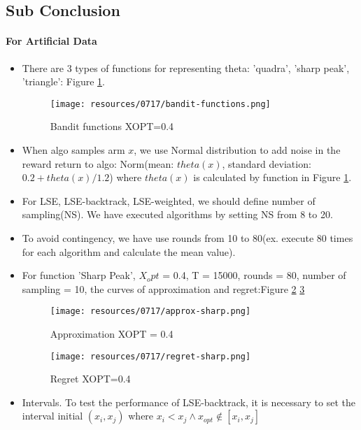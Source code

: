 \subsection*{Sub Conclusion}

\paragraph{For Artificial Data}
\begin{itemize}
	\item There are 3 types of functions for representing theta: 'quadra', 'sharp peak', 'triangle': Figure \ref{bandit-functions0.4}.
		\begin{figure}[h]
		\centering
		\texttt{[image: resources/0717/bandit-functions.png]}
		\caption{Bandit functions XOPT=0.4}
		\label{bandit-functions0.4}
		\end{figure}
		
	\item When algo samples arm $x$, we use Normal distribution to add noise in the reward return to algo: Norm(mean: $theta(x)$, standard deviation: $0.2 + theta(x)/1.2$) where $theta(x)$ is calculated by function in Figure \ref{bandit-functions0.4}.
	
	\item For LSE, LSE-backtrack, LSE-weighted, we should define number of sampling(NS). We have executed algorithms by setting NS from 8 to 20.
	
	\item To avoid contingency, we have use rounds from 10 to 80(ex. execute 80 times for each algorithm and calculate the mean value).
	
	\item For function 'Sharp Peak', $X_opt$ = 0.4, T = 15000, rounds = 80, number of sampling = 10, the curves of approximation and regret:Figure \ref{approx-sharp} \ref{regret-sharp}
	
	\begin{figure}[h]
		\centering
		\texttt{[image: resources/0717/approx-sharp.png]}
		\caption{Approximation XOPT = 0.4}
		\label{approx-sharp}
		\end{figure}
		
	\begin{figure}[h]
		\centering
		\texttt{[image: resources/0717/regret-sharp.png]}
		\caption{Regret XOPT=0.4}
		\label{regret-sharp}
		\end{figure}
	
	\item Intervals. To test the performance of LSE-backtrack, it is necessary to set the interval initial $(x_i, x_j)$ where $x_i < x_j \wedge x_{opt} \notin [x_i, x_j]$ 
	

\end{itemize}
